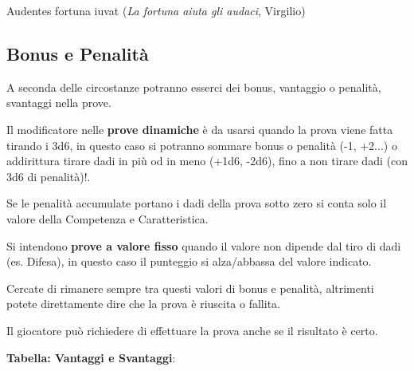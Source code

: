 \begin{multicols}{2}
\begin{enfasi}{Audentes fortuna iuvat (\emph{La fortuna aiuta gli audaci}, Virgilio) }\end{enfasi}

\subsection{Bonus e Penalità} \label{vantaggi}

A seconda delle circostanze potranno esserci dei bonus, vantaggio o penalità, svantaggi nella prove.

Il modificatore nelle \textbf{prove dinamiche} è da usarsi quando la prova viene fatta tirando i 3d6, in questo caso si potranno sommare bonus o penalità (-1, +2...) o addirittura tirare dadi in più od in meno (+1d6, -2d6), fino a non tirare dadi (con 3d6 di penalità)!.

Se le penalità accumulate portano i dadi della prova sotto zero si conta solo il valore della Competenza e Caratteristica.

Si intendono \textbf{prove a valore fisso}  quando il valore non dipende dal tiro di dadi (es. Difesa), in questo caso il punteggio si alza/abbassa del valore indicato.

Cercate di rimanere sempre tra questi valori di bonus e penalità, altrimenti potete direttamente dire che la prova è riuscita o fallita.

Il giocatore può richiedere di effettuare la prova anche se il risultato è certo.

\smallskip

\textbf{Tabella: Vantaggi e Svantaggi}:

\smallskip



\end{multicols}
